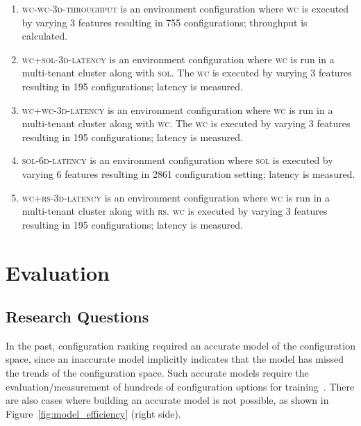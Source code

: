 \begin{enumerate}
    \item {} \textsc{\textsc{wc}-\textsc{wc}-3d-throughput} is an environment configuration where \textsc{wc} is executed by varying 3 features resulting in 755 configurations; throughput is calculated.
    
    \item {} \textsc{\textsc{wc}+\textsc{sol}-3d-latency} is an environment configuration where \textsc{wc} is run in a multi-tenant cluster along with \textsc{sol}. The \textsc{wc} is executed by varying 3 features resulting in 195 configurations; latency is measured.
    
    \item {} \textsc{\textsc{wc}+\textsc{wc}-3d-latency} is an environment configuration where \textsc{wc} is run in a multi-tenant cluster along with \textsc{wc}. The \textsc{wc} is executed by varying 3 features resulting in 195 configurations; latency is measured.
    
    
    \item {} \textsc{\textsc{sol}-6d-latency} is an environment configuration where \textsc{sol} is executed by varying 6 features resulting in 2861 configuration setting; latency is measured.
    
    \item {} \textsc{\textsc{wc}+\textsc{rs}-3d-latency} is an environment configuration where \textsc{wc} is run in a multi-tenant cluster along with \textsc{rs}. \textsc{wc} is executed by varying 3 features resulting in 195 configurations; latency is measured.
    
    
    
    
\end{enumerate}

\section{Evaluation}
\subsection{Research Questions}
In the past, configuration ranking required an accurate model of the configuration space, since an inaccurate model implicitly indicates that the model has missed the trends of the configuration space. Such accurate models require the evaluation/measurement of hundreds of configuration options for training~\cite{siegmund2012predicting, guo2013variability, sarkar2015cost}. There are also cases where building an accurate model is not possible, as shown in Figure~\ref{fig:model_efficiency} (right side). 

